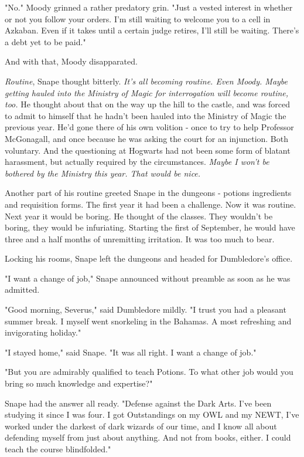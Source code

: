 "No." Moody grinned a rather predatory grin. "Just a vested interest in whether or not you follow your orders. I'm still waiting to welcome you to a cell in Azkaban. Even if it takes until a certain judge retires, I'll still be waiting. There's a debt yet to be paid."

And with that, Moody disapparated.

\emph{Routine}, Snape thought bitterly. \emph{It's all becoming routine. Even Moody. Maybe getting hauled into the Ministry of Magic for interrogation will become routine, too.} He thought about that on the way up the hill to the castle, and was forced to admit to himself that he hadn't been hauled into the Ministry of Magic the previous year. He'd gone there of his own volition - once to try to help Professor McGonagall, and once because he was asking the court for an injunction. Both voluntary. And the questioning at Hogwarts had not been some form of blatant harassment, but actually required by the circumstances. \emph{Maybe I won't be bothered by the Ministry this year. That would be nice.}

Another part of his routine greeted Snape in the dungeons - potions ingredients and requisition forms. The first year it had been a challenge. Now it was routine. Next year it would be boring. He thought of the classes. They wouldn't be boring, they would be infuriating. Starting the first of September, he would have three and a half months of unremitting irritation. It was too much to bear.

Locking his rooms, Snape left the dungeons and headed for Dumbledore's office.

"I want a change of job," Snape announced without preamble as soon as he was admitted.

"Good morning, Severus," said Dumbledore mildly. "I trust you had a pleasant summer break. I myself went snorkeling in the Bahamas. A most refreshing and invigorating holiday."

"I stayed home," said Snape. "It was all right. I want a change of job."

"But you are admirably qualified to teach Potions. To what other job would you bring so much knowledge and expertise?"

Snape had the answer all ready. "Defense against the Dark Arts. I've been studying it since I was four. I got Outstandings on my OWL and my NEWT, I've worked under the darkest of dark wizards of our time, and I know all about defending myself from just about anything. And not from books, either. I could teach the course blindfolded."

